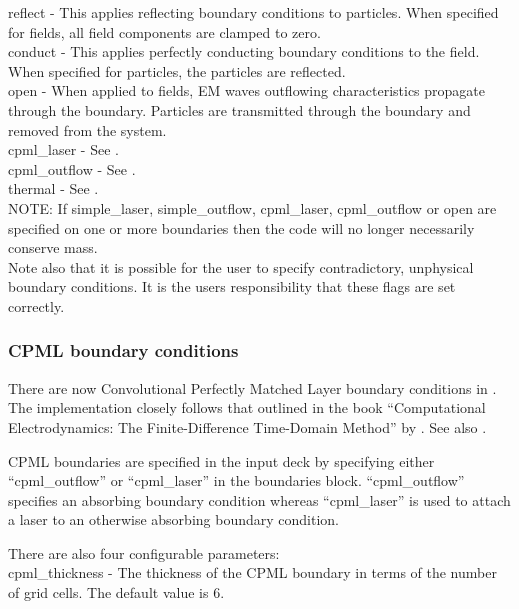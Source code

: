 {\emphtext reflect} - This applies reflecting boundary conditions to
  particles. When specified for fields, all field components are clamped
  to zero.\\

{\emphtext conduct} - This applies perfectly conducting boundary conditions
  to the field. When specified for particles, the particles are reflected.\\

{\emphtext open} - When applied to fields, EM waves outflowing characteristics
propagate through the boundary. Particles are transmitted through the boundary
and removed from the system.\\

{\emphtext cpml\_laser} - See .\\

{\emphtext cpml\_outflow} - See .\\

{\emphtext thermal} - See .\\

{\emphtext NOTE: If simple\_laser, simple\_outflow, cpml\_laser,
cpml\_outflow or open are specified on one or more boundaries then the code
will no longer necessarily conserve mass.}\\

Note also that it is possible for the user to specify contradictory,
unphysical boundary conditions. It is the users responsibility that these
flags are set correctly.


\subsubsection{CPML boundary conditions}
\label{sec:cpml}
There are now Convolutional Perfectly Matched Layer boundary conditions
in {\EPOCH}. The implementation closely follows that outlined in the book
``Computational Electrodynamics: The Finite-Difference Time-Domain Method'' by
\citet{Taflove}.  See also \citet{Roden}.

CPML boundaries are specified in the input deck by specifying either
``cpml\_outflow'' or ``cpml\_laser'' in the boundaries block. ``cpml\_outflow''
specifies an absorbing boundary condition whereas ``cpml\_laser'' is used
to attach a laser to an otherwise absorbing boundary condition.

There are also four configurable parameters:\\

{\emphtext cpml\_thickness} - The thickness of the CPML boundary in terms of the
  number of grid cells. The default value is 6.\\

